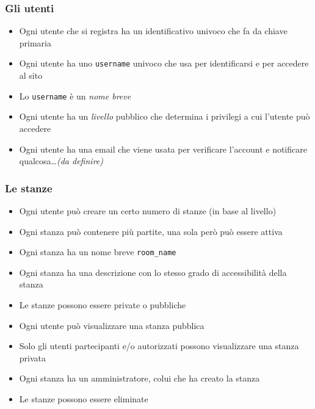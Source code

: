 \documentclass[10pt,a4paper]{article}
\begin{document}
\subsubsection{Gli utenti}
\begin{itemize}
\item Ogni utente che si registra ha un identificativo univoco che fa da chiave primaria
\item Ogni utente ha uno \texttt{username} univoco che usa per identificarsi e per accedere al sito
\item Lo \texttt{username} è un \emph{nome breve}
\item Ogni utente ha un \emph{livello} pubblico che determina i privilegi a cui l'utente può accedere
\item Ogni utente ha una email che viene usata per verificare l'account e notificare qualcosa\dots \emph{(da definire)}
\end{itemize}

\subsubsection{Le stanze}
\begin{itemize}
\item Ogni utente può creare un certo numero di stanze (in base al livello)
\item Ogni stanza può contenere più partite, una sola però può essere attiva
\item Ogni stanza ha un nome breve \texttt{room\_name}
\item Ogni stanza ha una descrizione con lo stesso grado di accessibilità della stanza
\item Le stanze possono essere private o pubbliche
\item Ogni utente può visualizzare una stanza pubblica
\item Solo gli utenti partecipanti e/o autorizzati possono visualizzare una stanza privata
\item Ogni stanza ha un amministratore, colui che ha creato la stanza
\item Le stanze possono essere eliminate
\end{itemize}
\end{document}
